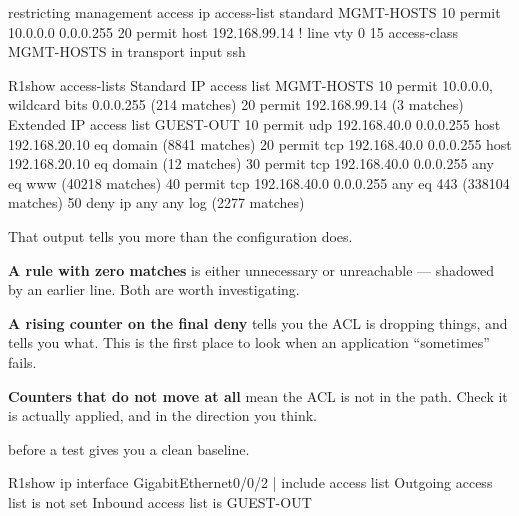 \begin{config}{restricting management access}
ip access-list standard MGMT-HOSTS
 10 permit 10.0.0.0 0.0.0.255
 20 permit host 192.168.99.14
!
line vty 0 15
 access-class MGMT-HOSTS in
 transport input ssh
\end{config}

\begin{verify}{R1}{show access-lists}
Standard IP access list MGMT-HOSTS
    10 permit 10.0.0.0, wildcard bits 0.0.0.255 (214 matches)
    20 permit 192.168.99.14 (3 matches)
Extended IP access list GUEST-OUT
    10 permit udp 192.168.40.0 0.0.0.255 host 192.168.20.10 eq domain (8841 matches)
    20 permit tcp 192.168.40.0 0.0.0.255 host 192.168.20.10 eq domain (12 matches)
    30 permit tcp 192.168.40.0 0.0.0.255 any eq www (40218 matches)
    40 permit tcp 192.168.40.0 0.0.0.255 any eq 443 (338104 matches)
    50 deny ip any any log (2277 matches)
\end{verify}

\begin{conceptbox}
That output tells you more than the configuration does.

\begin{tight}
  \item \textbf{A rule with zero matches} is either unnecessary or unreachable
        --- shadowed by an earlier line. Both are worth investigating.
  \item \textbf{A rising counter on the final deny} tells you the ACL is dropping
        things, and  tells you what. This is the first place to look when
        an application ``sometimes'' fails.
  \item \textbf{Counters that do not move at all} mean the ACL is not in the path.
        Check it is actually applied, and in the direction you think.
\end{tight}

 before a test gives you a clean baseline.
\end{conceptbox}

\begin{verify}{R1}{show ip interface GigabitEthernet0/0/2 | include access list}
  Outgoing access list is not set
  Inbound  access list is GUEST-OUT
\end{verify}

